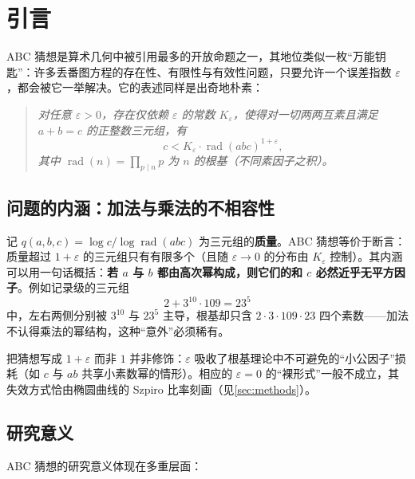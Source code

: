 \section{引言}\label{sec:introduction}

ABC 猜想是算术几何中被引用最多的开放命题之一，其地位类似一枚“万能钥匙”：许多丢番图方程的存在性、有限性与有效性问题，只要允许一个误差指数 $\varepsilon$，都会被它一举解决。它的表述同样是出奇地朴素：

\begin{quote}
    \textit{对任意 $\varepsilon > 0$，存在仅依赖 $\varepsilon$ 的常数 $K_\varepsilon$，使得对一切两两互素且满足 $a + b = c$ 的正整数三元组，有}
    \begin{equation*}
        c < K_\varepsilon \cdot \operatorname{rad}(abc)^{1+\varepsilon},
    \end{equation*}
    \textit{其中 $\operatorname{rad}(n) = \prod_{p \mid n} p$ 为 $n$ 的根基（不同素因子之积）。}
\end{quote}

\subsection{问题的内涵：加法与乘法的不相容性}

记 $q(a,b,c) = \log c / \log \operatorname{rad}(abc)$ 为三元组的\textbf{质量}。ABC 猜想等价于断言：质量超过 $1 + \varepsilon$ 的三元组只有有限多个（且随 $\varepsilon \to 0$ 的分布由 $K_\varepsilon$ 控制）。其内涵可以用一句话概括：\textbf{若 $a$ 与 $b$ 都由高次幂构成，则它们的和 $c$ 必然近乎无平方因子}。例如记录级的三元组
\begin{equation}
    2 + 3^{10} \cdot 109 = 23^5
\end{equation}
中，左右两侧分别被 $3^{10}$ 与 $23^5$ 主导，根基却只含 $2 \cdot 3 \cdot 109 \cdot 23$ 四个素数——加法不认得乘法的幂结构，这种“意外”必须稀有。

把猜想写成 $1 + \varepsilon$ 而非 $1$ 并非修饰：$\varepsilon$ 吸收了根基理论中不可避免的“小公因子”损耗（如 $c$ 与 $ab$ 共享小素数幂的情形）。相应的 $\varepsilon = 0$ 的“裸形式”一般不成立，其失效方式恰由椭圆曲线的 Szpiro 比率刻画（见\cref{sec:methods}）。

\subsection{研究意义}

ABC 猜想的研究意义体现在多重层面：

